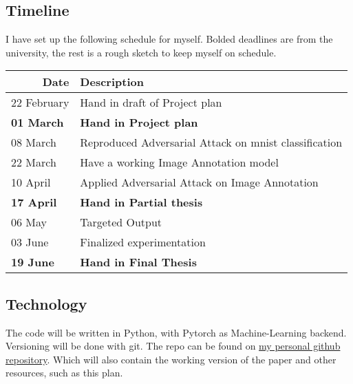 \documentclass[12pt]{extarticle}
\begin{document}
\subsection{Timeline}
I have set up the following schedule for myself. Bolded deadlines are from the university, the rest is a rough sketch to keep myself on schedule.

\begin{table}[h]
    \begin{tabular}{|l|l|}
        \hline
        \multicolumn{1}{|r|}{Date} & Description                                           \\ \hline
        22 February                & Hand in draft of Project plan                         \\ \hline
        \textbf{01 March}          & \textbf{Hand in Project plan}                         \\ \hline
        08 March                   & Reproduced Adversarial Attack on mnist classification \\ \hline
        22 March                   & Have a working Image Annotation model                 \\ \hline
        10 April                   & Applied Adversarial Attack on Image Annotation        \\ \hline
        \textbf{17 April}          & \textbf{Hand in Partial thesis}                       \\ \hline
        06 May                     & Targeted Output                                       \\ \hline
        03 June                    & Finalized experimentation                             \\ \hline
        \textbf{19 June}           & \textbf{Hand in Final Thesis}                         \\ \hline
    \end{tabular}
\end{table}


\subsection{Technology}
The code will be written in Python, with Pytorch as Machine-Learning backend.
Versioning will be done with git.
The repo can be found on \href{https://github.com/dikvangenuchten/bep-adversarial-image-annotation}{my personal github repository}. Which will also contain the working version of the paper and other resources, such as this plan.




\end{document}
